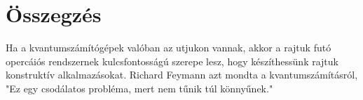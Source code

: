 \chapter{Összegzés}\label{sect:conclusion}
\hspace{2mm} Ha a kvantumszámítógépek valóban az utjukon vannak, akkor a rajtuk futó opercáiós rendszernek kulcsfontosságú szerepe lesz, hogy készíthessünk rajtuk konstruktív alkalmazásokat.
Richard Feymann azt mondta a kvantumszámításról, "Ez egy csodálatos probléma, mert nem tűnik túl könnyűnek."